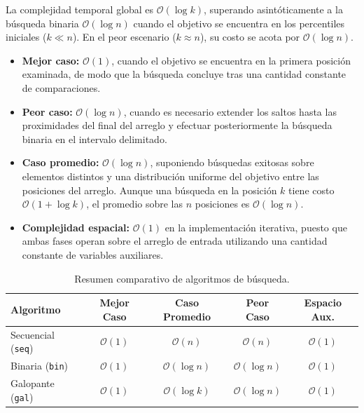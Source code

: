\documentclass[11pt,letterpaper]{article}
\begin{document}
\begin{enumerate}
\begin{enumerate}
        La complejidad temporal global es $\mathcal{O}(\log k)$, superando asintóticamente a la búsqueda binaria $\mathcal{O}(\log n)$ cuando el objetivo se encuentra en los percentiles iniciales ($k \ll n$). En el peor escenario ($k \approx n$), su costo se acota por $\mathcal{O}(\log n)$.
        
    \end{enumerate}

    \begin{itemize}
        \item \textbf{Mejor caso:} $\mathcal{O}(1)$, cuando el objetivo se encuentra en la primera posición examinada, de modo que la búsqueda concluye tras una cantidad constante de comparaciones.
        
        \item \textbf{Peor caso:} $\mathcal{O}(\log n)$, cuando es necesario extender los saltos hasta las proximidades del final del arreglo y efectuar posteriormente la búsqueda binaria en el intervalo delimitado.

        \item \textbf{Caso promedio:} $\mathcal{O}(\log n)$, suponiendo búsquedas exitosas sobre elementos distintos y una distribución uniforme del objetivo entre las posiciones del arreglo. Aunque una búsqueda en la posición $k$ tiene costo $\mathcal{O}(1+\log k)$, el promedio sobre las $n$ posiciones es $\mathcal{O}(\log n)$.

        \item \textbf{Complejidad espacial:} $\mathcal{O}(1)$ en la implementación iterativa, puesto que ambas fases operan sobre el arreglo de entrada utilizando una cantidad constante de variables auxiliares.
    \end{itemize}
    
\end{enumerate}

\begin{table}[htbp]
\centering
\caption{Resumen comparativo de algoritmos de búsqueda.}
\label{tab:search_complexity}
\small
\begin{tabular}{lcccc}
\toprule
\textbf{Algoritmo} & \textbf{Mejor Caso} & \textbf{Caso Promedio} & \textbf{Peor Caso} & \textbf{Espacio Aux.} \\
\midrule
Secuencial (\texttt{seq}) & $\mathcal{O}(1)$ & $\mathcal{O}(n)$ & $\mathcal{O}(n)$ & $\mathcal{O}(1)$ \\
Binaria (\texttt{bin})    & $\mathcal{O}(1)$ & $\mathcal{O}(\log n)$ & $\mathcal{O}(\log n)$ & $\mathcal{O}(1)$ \\
Galopante (\texttt{gal})  & $\mathcal{O}(1)$ & $\mathcal{O}(\log k)$ & $\mathcal{O}(\log n)$ & $\mathcal{O}(1)$ \\
\bottomrule
\end{tabular}
\end{table}
\newpage
\end{document}
